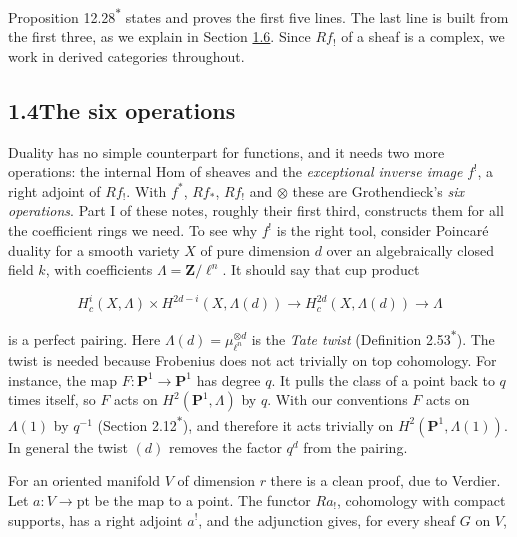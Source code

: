 \documentclass[11pt]{article}
\newcommand{\bpout}[1]{#1\textsuperscript{\hyperlink{bp-outside}{\ensuremath{\ast}}}}
\begin{document}
Proposition \bpout{12.28} states and proves the first five lines. The last line is built from the first three, as we explain in Section \hyperref[bp13]{1.6}. Since \(Rf_!\) of a sheaf is a complex, we work in derived categories throughout.


\subsection*{\texorpdfstring{1.4\quad The six operations}{1.4 The six operations}}
\label{bp9}%
\label{bp10}%
Duality has no simple counterpart for functions, and it needs two more operations: the internal Hom of sheaves and the \emph{exceptional inverse image} \(f^!\), a right adjoint of \(Rf_!\). With \(f^*\), \(Rf_*\), \(Rf_!\) and \(\otimes\) these are Grothendieck's \emph{six operations}. Part I of these notes, roughly their first third, constructs them for all the coefficient rings we need. To see why \(f^!\) is the right tool, consider Poincaré duality for a smooth variety \(X\) of pure dimension \(d\) over an algebraically closed field \(k\), with coefficients \(\Lambda=\mathbf Z/\ell^n\). It should say that cup product

\[
H_c^i(X,\Lambda)\times H^{2d-i}(X,\Lambda(d))\longrightarrow
H^{2d}_c(X,\Lambda(d))\longrightarrow\Lambda
\]

is a perfect pairing. Here \(\Lambda(d)=\mu_{\ell^n}^{\otimes d}\) is the \emph{Tate twist} (Definition \bpout{2.53}). The twist is needed because Frobenius does not act trivially on top cohomology. For instance, the map \(F:\mathbf P^1\to\mathbf P^1\) has degree \(q\). It pulls the class of a point back to \(q\) times itself, so \(F\) acts on \(H^2(\mathbf P^1,\Lambda)\) by \(q\). With our conventions \(F\) acts on \(\Lambda(1)\) by \(q^{-1}\) (Section \bpout{2.12}), and therefore it acts trivially on \(H^2(\mathbf P^1,\Lambda(1))\). In general the twist \((d)\) removes the factor \(q^d\) from the pairing.

For an oriented manifold \(V\) of dimension \(r\) there is a clean proof, due to Verdier. Let \(a:V\to\mathrm{pt}\) be the map to a point. The functor \(Ra_!\), cohomology with compact supports, has a right adjoint \(a^!\), and the adjunction gives, for every sheaf \(G\) on \(V\),
\end{document}
